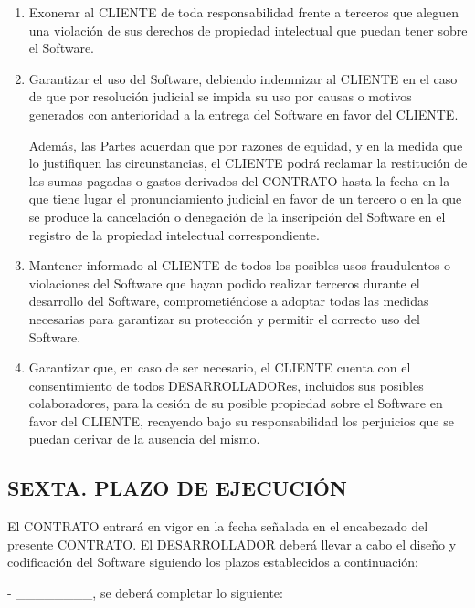 \documentclass[a4paper,11pt]{report}
\begin{document}
	\begin{enumerate}[label=\Alph*)]
		\item Exonerar al CLIENTE de toda responsabilidad frente a terceros que
		aleguen una violación de sus derechos de propiedad intelectual que
		puedan tener sobre el Software.

		\item Garantizar el uso del Software, debiendo indemnizar al CLIENTE en el
		caso de que por resolución judicial se impida su uso por causas o
		motivos generados con anterioridad a la entrega del Software en favor
		del CLIENTE.

		Además, las Partes acuerdan que por razones de equidad, y en la medida
		que lo justifiquen las circunstancias, el CLIENTE podrá reclamar la
		restitución de las sumas pagadas o gastos derivados del CONTRATO hasta
		la fecha en la que tiene lugar el pronunciamiento judicial en favor de
		un tercero o en la que se produce la cancelación o denegación de la
		inscripción del Software en el registro de la propiedad intelectual
		correspondiente.

		\item Mantener informado al CLIENTE de todos los posibles usos fraudulentos
		o violaciones del Software que hayan podido realizar terceros durante el
		desarrollo del Software, comprometiéndose a adoptar todas las medidas
		necesarias para garantizar su protección y permitir el correcto uso del
		Software.

		\item Garantizar que, en caso de ser necesario, el CLIENTE cuenta con el
		consentimiento de todos DESARROLLADORes, incluidos sus posibles
		colaboradores, para la cesión de su posible propiedad sobre el Software
		en favor del CLIENTE, recayendo bajo su responsabilidad los perjuicios
		que se puedan derivar de la ausencia del mismo.

	\end{enumerate}

	\subsection*{SEXTA. PLAZO DE EJECUCIÓN}

	El CONTRATO entrará en vigor en la fecha señalada en el encabezado del
	presente CONTRATO. El DESARROLLADOR deberá llevar a cabo el diseño y
	codificación del Software siguiendo los plazos establecidos a
	continuación:

	- \_\_\_\_\_\_\_\_, se deberá completar lo siguiente:
\end{document}
